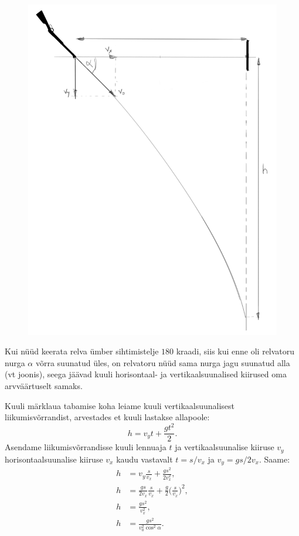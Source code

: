 {\begingroup
\setlength{\columnsep}{1pt}
\begin{figure}
	\vspace{-20pt}
	\includegraphics[width = \linewidth]{2016-v2g-06-Lasketiir-2.PNG}
\end{figure}
Kui nüüd keerata relva ümber sihtimistelje $180$ kraadi, siis kui enne oli relvatoru nurga $\alpha$ võrra suunatud üles, on relvatoru nüüd sama nurga jagu suunatud alla (vt joonis), seega jäävad kuuli horisontaal- ja vertikaalsuunalised kiirused oma arvväärtuselt samaks.

Kuuli märklaua tabamise koha leiame kuuli vertikaalsuunalisest liikumisvõrrandist, arvestades et kuuli lastakse allapoole:
$$
h=v_{y}t+\frac{gt^2}{2}.
$$
Asendame liikumisvõrrandisse kuuli lennuaja $t$ ja vertikaalsuunalise kiiruse $v_y$ horisontaalsuunalise kiiruse $v_x$ kaudu vastavalt $t=s / v_x$ ja $v_y = gs/2v_x$. Saame:
\begin{align*}
h & = v_{y}\frac{s}{v_{x}}+\frac{gs^2}{2v_{x}^2},\\
h & = \frac{gs}{2v_x}\frac{s}{v_{x}}+\frac{g}{2}\Big(\frac{s}{v_{x}}\Big)^2,\\
h & = \frac{gs^2}{v_{x}^2},\\
h & = \frac{gs^2}{v_{0}^2\cos^2\alpha}.
\end{align*}
\endgroup

}
